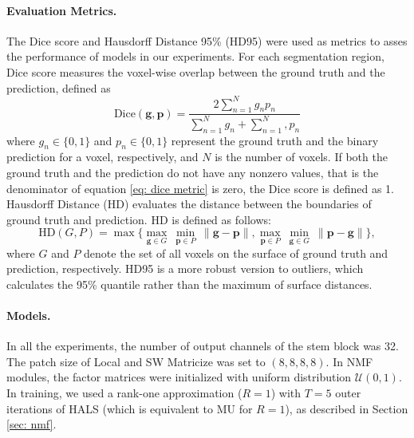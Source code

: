 \documentclass[a4,12pt]{article}
\begin{document}
	\paragraph{Evaluation Metrics.}
	The Dice score and Hausdorff Distance 95\% (HD95) were used as metrics to asses the performance of models in our experiments. For each segmentation region, Dice score measures the voxel-wise overlap between the ground truth and the prediction, defined as
	\begin{equation}
		\label{eq: dice metric}
		\text{Dice}(\mathbf{g}, \mathbf{p}) = \frac{2 \sum_{n=1}^{N} g_n p_n}{\sum_{n=1}^{N} g_n + \sum_{n=1}^{N}, p_n}
	\end{equation}	
	where $ g_n \in \{0, 1\} $ and $ p_n \in \{0, 1\} $ represent the ground truth and the binary prediction for a voxel, respectively, and $ N $ is the number of voxels. If both the ground truth and the prediction do not have any nonzero values, that is the denominator of equation \eqref{eq: dice metric} is zero, the Dice score is defined as 1. Hausdorff Distance (HD) evaluates the distance between the boundaries of ground truth and prediction. HD is defined as follows:
	\begin{equation}
		\label{eq: hd metric}
		\text{HD}(G, P) = \max\{ \underset{\mathbf{g} \in G}{\max}\ \underset{\mathbf{p} \in P}{\min}\ \lVert \mathbf{g} - \mathbf{p} \rVert, \underset{\mathbf{p} \in P}{\max}\ \underset{\mathbf{g} \in G}{\min}\  \lVert \mathbf{p} - \mathbf{g} \rVert \},
	\end{equation}
	where $ G $ and $ P $ denote the set of all voxels on the surface of ground truth and prediction, respectively. HD95 is a more robust version to outliers, which calculates the 95\% quantile rather than the maximum of surface distances.
	
	\paragraph{Models.} 
	In all the experiments, the number of output channels of the stem block was 32. The patch size of Local and SW Matricize was set to $ (8, 8, 8, 8) $. In NMF modules, the factor matrices were initialized with uniform distribution $ \mathcal{U}(0, 1) $. In training, we used a rank-one approximation ($ R = 1 $) with $ T = 5 $ outer iterations of HALS (which is equivalent to MU for $ R = 1 $), as described in Section \ref{sec: nmf}. 
	
\end{document}
